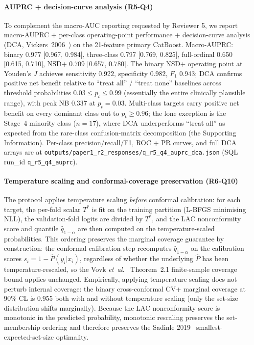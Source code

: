 \documentclass[10pt,letterpaper]{article}
\begin{document}
\paragraph*{AUPRC + decision-curve analysis (R5-Q4)} To complement the macro-AUC reporting requested by Reviewer 5, we report macro-AUPRC + per-class operating-point performance + decision-curve analysis (DCA, Vickers~2006~\cite{vickers2006dca}) on the 21-feature primary CatBoost. Macro-AUPRC: binary 0.977 [0.967, 0.984], three-class 0.797 [0.769, 0.825], full-ordinal 0.650 [0.615, 0.710], NSD+ 0.709 [0.657, 0.780]. The binary NSD+ operating point at Youden's $J$ achieves sensitivity 0.922, specificity 0.982, $F_1$ 0.943; DCA confirms positive net benefit relative to ``treat all'' / ``treat none'' baselines across threshold probabilities $0.03 \leq p_t \leq 0.99$ (essentially the entire clinically plausible range), with peak NB 0.337 at $p_t{=}0.03$. Multi-class targets carry positive net benefit on every dominant class out to $p_t \geq 0.96$; the lone exception is the Stage~4 minority class ($n{=}17$), where DCA underperforms ``treat all'' as expected from the rare-class confusion-matrix decomposition (the Supporting Information). Per-class precision/recall/F1, ROC + PR curves, and full DCA arrays are at \texttt{outputs/paper1\_r2\_responses/q\_r5\_q4\_auprc\_dca.json} (SQL run\_id \texttt{q\_r5\_q4\_auprc}).

\paragraph*{Temperature scaling and conformal-coverage preservation (R6-Q10)} The protocol applies temperature scaling \emph{before} conformal calibration: for each target, the per-fold scalar $T^*$ is fit on the training partition (L-BFGS minimising NLL), the validation-fold logits are divided by $T^*$, and the LAC nonconformity score and quantile $\hat{q}_{1-\alpha}$ are then computed on the temperature-scaled probabilities. This ordering preserves the marginal coverage guarantee by construction: the conformal calibration step recomputes $\hat{q}_{1-\alpha}$ on the calibration scores $s_i = 1 - \hat{P}(y_i | x_i)$, regardless of whether the underlying $\hat{P}$ has been temperature-rescaled, so the Vovk \emph{et~al.}~\cite{vovk2022} Theorem~2.1 finite-sample coverage bound applies unchanged. Empirically, applying temperature scaling does not perturb internal coverage: the binary cross-conformal CV+ marginal coverage at 90\% CL is 0.955 both with and without temperature scaling (only the set-size distribution shifts marginally). Because the LAC nonconformity score is monotonic in the predicted probability, monotonic rescaling preserves the set-membership ordering and therefore preserves the Sadinle 2019~\cite{sadinle2019lac} smallest-expected-set-size optimality.
\end{document}
